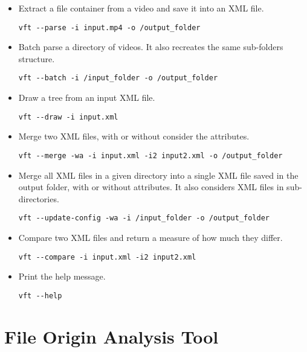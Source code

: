 \begin{itemize}

\item Extract a file container from a video and save it into an XML file.
\begin{lstlisting}
vft --parse -i input.mp4 -o /output_folder
\end{lstlisting}

\item Batch parse a directory of videos. It also recreates the same sub-folders structure.
\begin{lstlisting}
vft --batch -i /input_folder -o /output_folder
\end{lstlisting}

\item Draw a tree from an input XML file.
\begin{lstlisting}
vft --draw -i input.xml
\end{lstlisting}

\item Merge two XML files, with or without consider the attributes.
\begin{lstlisting}
vft --merge -wa -i input.xml -i2 input2.xml -o /output_folder
\end{lstlisting}

\item Merge all XML files in a given directory into a single XML file saved in the output folder, with or without attributes. It also considers XML files in sub-directories.
\begin{lstlisting}
vft --update-config -wa -i /input_folder -o /output_folder
\end{lstlisting}

\item Compare two XML files and return a measure of how much they differ.
\begin{lstlisting}
vft --compare -i input.xml -i2 input2.xml
\end{lstlisting}

\item Print the help message.
\begin{lstlisting}
vft --help
\end{lstlisting}

\end{itemize}


\section{File Origin Analysis Tool}

